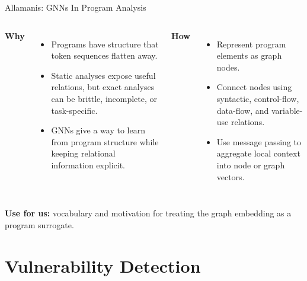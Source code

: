 \documentclass[10pt]{beamer}
\begin{document}
\begin{frame}{Allamanis: GNNs In Program Analysis}
  \begin{columns}[T,onlytextwidth]
    \textbf{Why}
    \begin{itemize}
      \item Programs have structure that token sequences flatten away.
      \item Static analyses expose useful relations, but exact analyses can be brittle, incomplete, or task-specific.
      \item GNNs give a way to learn from program structure while keeping relational information explicit.
    \end{itemize}

    \textbf{How}
    \begin{itemize}
      \item Represent program elements as graph nodes.
      \item Connect nodes using syntactic, control-flow, data-flow, and variable-use relations.
      \item Use message passing to aggregate local context into node or graph vectors.
    \end{itemize}
  \end{columns}

  \vspace{0.25cm}
  \textbf{Use for us:} vocabulary and motivation for treating the graph embedding as a program surrogate.
\end{frame}

\section{Vulnerability Detection}
\end{document}
